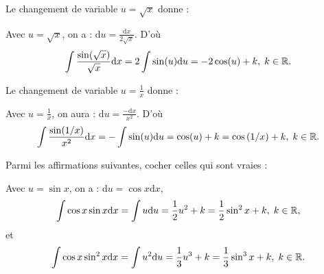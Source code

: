 \begin{question}
Le changement de variable $u=\sqrt{x}$ donne :
\begin{answers}  
\end{answers}
\begin{explanations}
Avec $u=\sqrt{x}$, on a : $\displaystyle \mathrm{d}u=\frac{\mathrm{d}x}{2\sqrt{x}}$. D'où
$$\int \frac{\sin (\sqrt{x})}{\sqrt{x}}\mathrm{d}x=2\int \sin (u)\mathrm{d}u=-2\cos (u)+k,\; k\in \mathbb{R}.$$
\end{explanations}
\end{question}

\begin{question}
Le changement de variable $\displaystyle u=\frac{1}{x}$ donne :
\begin{answers}  
\end{answers}
\vskip2mm
\begin{explanations}
Avec $\displaystyle u=\frac{1}{x}$, on aura : $\displaystyle \mathrm{d}u=\frac{-\mathrm{d}x}{x^2}$. D'où
$$\int \frac{\sin (1/x)}{x^2}\mathrm{d}x=-\int \sin (u)\mathrm{d}u=\cos (u)+k=\cos\left(1/x\right)+k,\; k\in \mathbb{R}.$$
\end{explanations}
\end{question}

\begin{question}
Parmi les affirmations suivantes, cocher celles qui sont vraies :
\begin{answers}  
\end{answers}
\begin{explanations}
Avec $u=\sin x$, on a : $\mathrm{d}u=\cos x\mathrm{d}x$,
$$\int \cos x\sin x\mathrm{d}x=\int u\mathrm{d}u=\frac{1}{2}u^2+k=\frac{1}{2}\sin ^2x+k,\; k\in \mathbb{R},$$
et
$$\int \cos x\sin ^2x\mathrm{d}x=\int u^2\mathrm{d}u=\frac{1}{3}u^3+k=\frac{1}{3}\sin ^3x+k,\; k\in \mathbb{R}.$$
\end{explanations}
\end{question}

